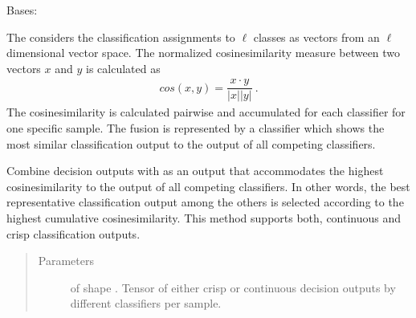 \documentclass[letterpaper,10pt,english]{sphinxmanual}
\begin{document}
\begin{fulllineitems}
\label{\detokenize{pusion.core.cosine_similarity_combiner:pusion.core.cosine_similarity_combiner.CosineSimilarityCombiner}}
\sphinxAtStartPar
Bases: {\hyperref[\detokenize{pusion.core.combiner:pusion.core.combiner.UtilityBasedCombiner}]{}}

\sphinxAtStartPar
The {\hyperref[\detokenize{pusion.core.cosine_similarity_combiner:pusion.core.cosine_similarity_combiner.CosineSimilarityCombiner}]{}} considers the classification assignments to \(\ell\) classes as vectors
from an \(\ell\)\sphinxhyphen{}dimensional vector space. The normalized cosine\sphinxhyphen{}similarity measure between two vectors
\(x\) and \(y\) is calculated as
\begin{equation*}
\begin{split}cos(x,y) = \dfrac{x\cdot y}{|x||y|}\ .\end{split}
\end{equation*}
\sphinxAtStartPar
The cosine\sphinxhyphen{}similarity is calculated pairwise and accumulated for each classifier for one specific sample.
The fusion is represented by a classifier which shows the most similar classification output to the output of all
competing classifiers.

\begin{fulllineitems}
\label{\detokenize{pusion.core.cosine_similarity_combiner:pusion.core.cosine_similarity_combiner.CosineSimilarityCombiner.combine}}
\sphinxAtStartPar
Combine decision outputs with as an output that accommodates the highest cosine\sphinxhyphen{}similarity to the output of
all competing classifiers. In other words, the best representative classification output among the others is
selected according to the highest cumulative cosine\sphinxhyphen{}similarity. This method supports both, continuous and
crisp classification outputs.
\begin{quote}\begin{description}
\item[{Parameters}] \leavevmode
\sphinxAtStartPar
{} \textendash{}  of shape .
Tensor of either crisp or continuous decision outputs by different classifiers per sample.


\end{description}
\end{quote}
\end{fulllineitems}
\end{fulllineitems}
\end{document}

